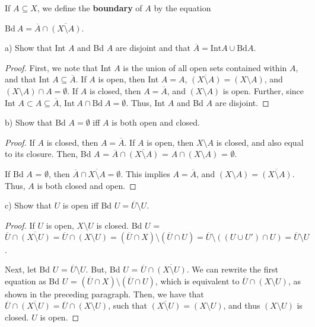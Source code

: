 \documentclass[11pt]{article}
\begin{document}
If \(A\subseteq X\), we define the \textbf{boundary} of \(A\) by the
equation

\(\text{Bd}\ A = \overline{A}\cap\overline{(X\setminus A)}\).

a) Show that Int \(A\) and Bd \(A\) are disjoint and that \(\overline{A} =
   \text{Int} A\cup\text{Bd}A\).

\begin{proof}


First, we note that Int \(A\) is the union of all open sets contained
within \(A\), and that Int \(A \subseteq \overline{A}\). If \(A\) is open,
then Int \(A = A\), \(\overline{(X\setminus A)} = (X\setminus A)\), and
\((X\setminus A)\cap A = \emptyset\). If \(A\) is closed, then \(A =
\overline{A}\), and \((X\setminus A)\) is open. Further, since Int \(A
\subset A \subseteq \overline{A}\), \(\text{Int}\ A\cap \text{Bd}\ A =
\emptyset\). Thus, Int \(A\) and Bd \(A\) are disjoint. 
\end{proof}

b) Show that Bd \(A = \emptyset\) iff \(A\) is both open and closed.

\begin{proof}
If \(A\) is closed, then \(A = \overline{A}\). If \(A\) is open, then
\(X\setminus A\) is closed, and also equal to its closure. Then, Bd \(A\)
= \(\overline{A}\cap\overline{(X\setminus A)}\) = \(A\cap(X\setminus A)\)
= \(\emptyset\). 

If Bd \(A\) = \(\emptyset\), then \(\overline{A}\cap\overline{X\setminus A}
= \emptyset\). This implies \(A = \overline{A}\), and \((X\setminus A) =
\overline{(X\setminus A)}\). Thus, \(A\) is both closed and open. 
\end{proof}

c) Show that \(U\) is open iff Bd \(U = \overline{U}\setminus U\).

\begin{proof}
If \(U\) is open, \(X\setminus U\) is closed. Bd \(U\) =
\(\overline{U}\cap\overline{(X\setminus U)} =
\overline{U}\cap(X\setminus U) = (\overline{U}\cap X)\setminus
(\overline{U}\cap U) = \overline{U}\setminus((U\cup U')\cap U) =
\overline{U}\setminus U\).

Next, let Bd \(U\) = \(\overline{U}\setminus U\). But, Bd \(U\) =
\(\overline{U}\cap\overline{(X\setminus U)}\). We can rewrite the first
equation as Bd \(U\) = \((\overline{U}\cap X)\setminus (\overline{U}\cap
U)\), which is equivalent to \(\overline{U}\cap (X\setminus U)\), as
shown in the preceding paragraph. Then, we have that
\(\overline{U}\cap\overline{(X\setminus U)} = \overline{U}\cap
(X\setminus U)\), such that \(\overline{(X\setminus U)} = (X\setminus
U)\), and thus \((X\setminus U)\) is closed. \(U\) is open. 
\end{proof}
\end{document}
